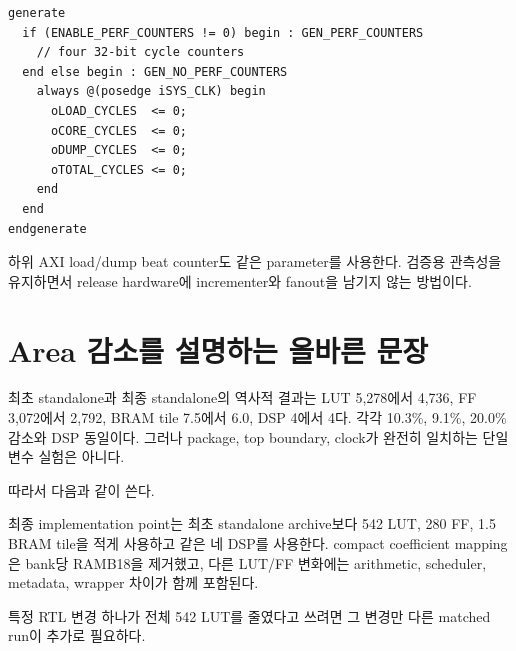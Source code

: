 \begin{lstlisting}
generate
  if (ENABLE_PERF_COUNTERS != 0) begin : GEN_PERF_COUNTERS
    // four 32-bit cycle counters
  end else begin : GEN_NO_PERF_COUNTERS
    always @(posedge iSYS_CLK) begin
      oLOAD_CYCLES  <= 0;
      oCORE_CYCLES  <= 0;
      oDUMP_CYCLES  <= 0;
      oTOTAL_CYCLES <= 0;
    end
  end
endgenerate
\end{lstlisting}

하위 AXI load/dump beat counter도 같은 parameter를 사용한다. 검증용 관측성을
유지하면서 release hardware에 incrementer와 fanout을 남기지 않는 방법이다.

\section{Area 감소를 설명하는 올바른 문장}

최초 standalone과 최종 standalone의 역사적 결과는 LUT 5,278에서 4,736,
FF 3,072에서 2,792, BRAM tile 7.5에서 6.0, DSP 4에서 4다. 각각 10.3\%,
9.1\%, 20.0\% 감소와 DSP 동일이다. 그러나 package, top boundary, clock가
완전히 일치하는 단일 변수 실험은 아니다.

따라서 다음과 같이 쓴다.

\begin{goodbox}[권장 해석]
최종 implementation point는 최초 standalone archive보다 542 LUT, 280 FF,
1.5 BRAM tile을 적게 사용하고 같은 네 DSP를 사용한다. compact coefficient
mapping은 bank당 RAMB18을 제거했고, 다른 LUT/FF 변화에는 arithmetic,
scheduler, metadata, wrapper 차이가 함께 포함된다.
\end{goodbox}

특정 RTL 변경 하나가 전체 542 LUT를 줄였다고 쓰려면 그 변경만 다른 matched
run이 추가로 필요하다.
